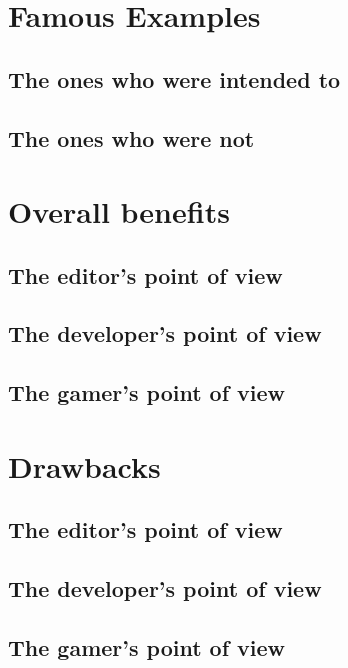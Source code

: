 \documentclass[a4paper,11pt]{article}
\begin{document}
\section{Famous Examples}


\subsection{The ones who were intended to}

\subsection{The ones who were not}


\section{Overall benefits}

\subsection{The editor's point of view}

\subsection{The developer's point of view}

\subsection{The gamer's point of view}


\section{Drawbacks }

\subsection{The editor's point of view}

\subsection{The developer's point of view}

\subsection{The gamer's point of view}
\end{document}
